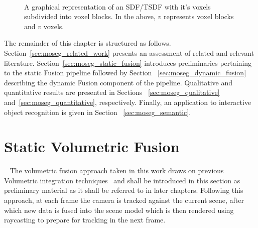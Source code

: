 \begin{figure}[!htbp]
{
  }
  \caption[TSDF split in to voxel blocks]{A graphical representation of an 
  SDF/TSDF with it's voxels subdivided into voxel blocks. In the above, \(v\) 
  represents voxel blocks and \(v\) voxels.}
~\label{figure:voxel_blocks}
\end{figure}

The remainder of this chapter is structured as follows.
Section~\ref{sec:moseg_related_work} presents an assessment of related and
relevant literature. Section~\ref{sec:moseg_static_fusion} introduces
preliminaries pertaining to the static Fusion pipeline followed by Section
~\ref{sec:moseg_dynamic_fusion} describing the dynamic Fusion component of the
pipeline. Qualitative and quantitative results are presented in Sections
~\ref{sec:moseg_qualitative} and~\ref{sec:moseg_quantitative}, respectively.
Finally, an application to interactive object recognition is given in Section
~\ref{sec:moseg_semantic}.

\section{Static Volumetric Fusion}
~\label{sec:moseg_static_fusion}
The volumetric fusion approach taken in this work draws on previous Volumetric
integration techniques~\cite{Curless1996, Newcombe2011, NieBner2013, Prisacariu2014} 
and shall be introduced in this section as preliminary material as it shall be
referred to in later chapters. Following this approach, at each frame the camera
is tracked against the current scene, after which new data is fused into the
scene model which is then rendered using raycasting to prepare for tracking in
the next frame.

